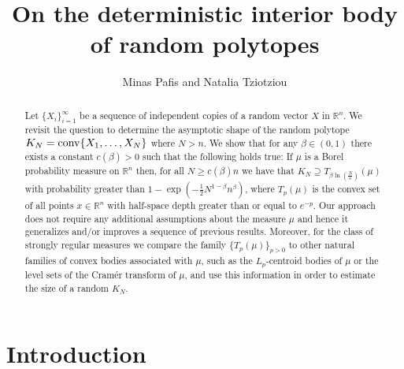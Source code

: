\documentclass[11pt,leqno]{article}
\theoremstyle{definition}
\theoremstyle{remark}
\numberwithin{equation}{section}
\newcommand{\gr}{\geqslant}
\newcommand{\1}{\textbf{1}}
\begin{document}
\small

\title{\bf On the deterministic interior body of random polytopes}

\medskip

\author{Minas Pafis and Natalia Tziotziou}

\date{}
\maketitle

\begin{abstract}\footnotesize Let $\{X_i\}_{i=1}^{\infty}$ be a sequence of independent copies of a random
vector $X$ in $\mathbb{R}^n$.  We revisit the question to determine the asymptotic shape of the
random polytope $K_N={\rm conv}\{X_1,\ldots ,X_N\}$ where $N>n$. We show that for any $\beta\in (0,1)$
there exists a constant $c(\beta)>0$ such that the following holds true: If $\mu $ is a Borel probability
measure on ${\mathbb R}^n$ then, for all $N\gr c(\beta)n$ we have that $K_N\supseteq T_{\beta\ln(\frac{N}{n})}(\mu)$
with probability greater than $1-\exp(-\tfrac{1}{2}N^{1-\beta}n^{\beta})$, where $T_p(\mu)$ is the convex set
of all points $x\in\mathbb{R}^n$ with half-space depth greater than or equal to $e^{-p}$. Our approach does not
require any additional assumptions about the measure $\mu$ and hence it generalizes and/or improves a sequence of
previous results. Moreover, for the class of strongly regular measures we compare the family $\{T_p(\mu)\}_{p>0}$
to other natural families of convex bodies associated with $\mu$, such as the $L_p$-centroid bodies of $\mu$
or the level sets of the Cram\'{e}r transform of $\mu$, and use this information in order to estimate the size
of a random $K_N$.
\end{abstract}



\section{Introduction}\label{section-1}
\end{document}
